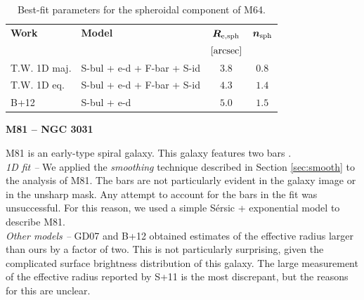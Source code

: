 \documentclass[preprint2]{emulateapj}
\begin{document}
  \begin{table}[h]
  \small
  \caption{Best-fit parameters for the spheroidal component of M64.}
  \begin{center}
  \begin{tabular}{llcc}
  \hline
  {\bf Work} & {\bf Model}   & $\bm R_{\rm e,sph}$    & $\bm n_{\rm sph}$ \\
    &  &  $[\rm arcsec]$ & \\
  \hline
  T.W. 1D maj. & S-bul + e-d + F-bar + S-id  & $3.8$  &  $0.8$ \\
  T.W. 1D eq.  & S-bul + e-d + F-bar + S-id  & $4.3$  &  $1.4$ \\
  \hline
  B+12      & S-bul + e-d  & $5.0$  &  $1.5$ \\
  \hline
  \end{tabular}
  \end{center}
  \label{tab:m64}
  \end{table}


  \clearpage\newpage\noindent
  {\bf M81 -- NGC 3031 \\}

  M81 is an early-type spiral galaxy.
  This galaxy features two bars \citep{elmegreen1995m81,gutierrez2011,erwindebattista2013}. \\

  \emph{1D fit -- }
  We applied the \emph{smoothing} technique described in Section \ref{sec:smooth} to the analysis of M81.
  The bars are not particularly evident in the galaxy image or in the unsharp mask.
  Any attempt to account for the bars in the fit was unsuccessful. 
  For this reason, we used a simple S\'ersic + exponential model to describe M81. \\
  
  \emph{Other models -- } 
  GD07 and B+12 obtained estimates of the effective radius larger than ours by a factor of two. 
  This is not particularly surprising, given the complicated surface brightness distribution of this galaxy. 
  The large measurement of the effective radius reported by S+11 is the most discrepant, 
  but the reasons for this are unclear. 
\end{document}
